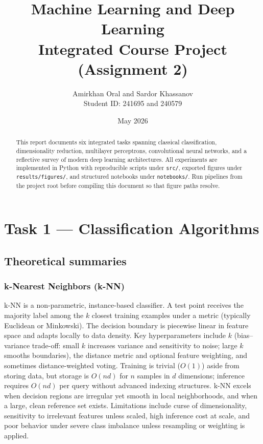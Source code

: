 \documentclass[11pt,a4paper]{article}
\title{Machine Learning and Deep Learning\\Integrated Course Project (Assignment 2)}
\author{Amirkhan Oral and Sardor Khassanov\\Student ID: 241695 and  240579 }
\date{May 2026}
\begin{document}
\maketitle
\begin{abstract}
This report documents six integrated tasks spanning classical classification, dimensionality reduction, multilayer perceptrons, convolutional neural networks, and a reflective survey of modern deep learning architectures. All experiments are implemented in Python with reproducible scripts under \texttt{src/}, exported figures under \texttt{results/figures/}, and structured notebooks under \texttt{notebooks/}. Run pipelines from the project root before compiling this document so that figure paths resolve.
\end{abstract}
\onehalfspacing
\tableofcontents
\newpage

\section{Task 1 --- Classification Algorithms}

\subsection{Theoretical summaries}

\subsubsection{k-Nearest Neighbors (k-NN)}
k-NN is a non-parametric, instance-based classifier. A test point receives the majority label among the $k$ closest training examples under a metric (typically Euclidean or Minkowski). The decision boundary is piecewise linear in feature space and adapts locally to data density. Key hyperparameters include $k$ (bias--variance trade-off: small $k$ increases variance and sensitivity to noise; large $k$ smooths boundaries), the distance metric and optional feature weighting, and sometimes distance-weighted voting. Training is trivial ($O(1)$) aside from storing data, but storage is $O(n d)$ for $n$ samples in $d$ dimensions; inference requires $O(n d)$ per query without advanced indexing structures. k-NN excels when decision regions are irregular yet smooth in local neighborhoods, and when a large, clean reference set exists. Limitations include curse of dimensionality, sensitivity to irrelevant features unless scaled, high inference cost at scale, and poor behavior under severe class imbalance unless resampling or weighting is applied.
\end{document}
